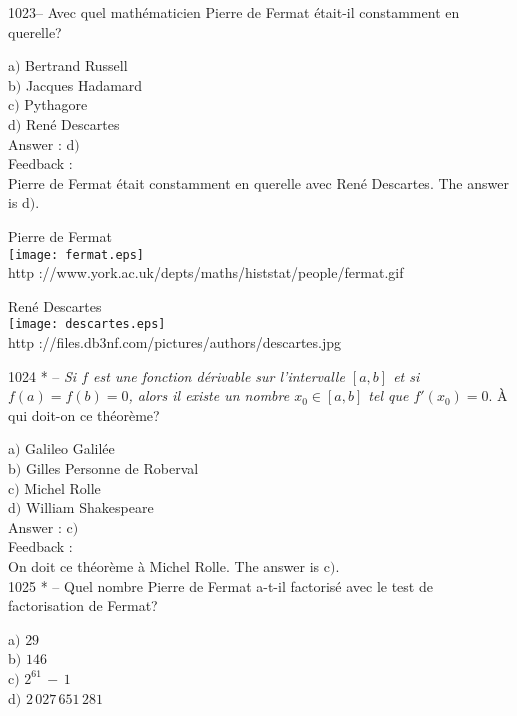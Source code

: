 ﻿\documentclass[letterpaper, 12pt]{article}
\begin{document}
1023-- Avec quel math\'ematicien Pierre de Fermat \'etait-il
constamment en querelle?

a$)$ Bertrand Russell \\
b$)$ Jacques Hadamard \\
c$)$ Pythagore \\
d$)$ Ren\'e Descartes\\

Answer : d$)$\\

Feedback : \\
Pierre de Fermat \'etait constamment en querelle avec Ren\'e
Descartes. The answer is d$)$.

        \begin{center}
        Pierre de Fermat\\
    \texttt{[image: fermat.eps]}\\
        {\footnotesize http
://www.york.ac.uk/depts/maths/histstat/people/fermat.gif}
    \end{center}

        \begin{center}
        Ren\'e Descartes\\
    \texttt{[image: descartes.eps]}\\
        {\footnotesize http
://files.db3nf.com/pictures/authors/descartes.jpg}
    \end{center}


1024 * -- {\sl Si $f$ est une fonction d\'erivable sur l'intervalle
$[a,b]$ et si $f(a)=f(b)=0$, alors il existe un nombre $x_0\in[a,b]$
tel que $f'(x_0)=0$}. \`A qui doit-on ce th\'eor\`eme?

a$)$ Galileo Galil\'ee \\
b$)$ Gilles Personne de Roberval \\
c$)$ Michel Rolle \\
d$)$ William Shakespeare\\

Answer : c$)$\\

Feedback : \\
On doit ce th\'eor\`eme \`a Michel Rolle.
The answer is c$)$.\\


1025 * -- Quel nombre Pierre de Fermat a-t-il factoris\'e avec le
test de factorisation de Fermat?

a$)$ $29$ \\
b$)$ $146$ \\
c$)$ $2^{61}\,-\,1$ \\
d$)$ $2\,027\,651\,281$\\
\end{document}
